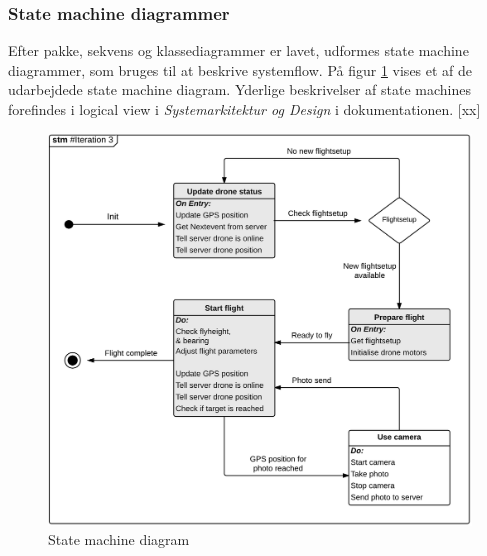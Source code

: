 \newpage

\subsubsection*{State machine diagrammer}
\vspace{-0.3cm}	

Efter pakke, sekvens og klassediagrammer er lavet, udformes state machine diagrammer, som bruges til at beskrive systemflow. På figur \ref{fig:stm} vises et af de udarbejdede state machine diagram. Yderlige beskrivelser af state machines forefindes i logical view i \textit{Systemarkitektur og Design} i dokumentationen. [xx]

\begin{figure}[H]
	\centering
	\includegraphics[width=1\textwidth]{Billeder/State_iteration3.png}
	\vspace{-0.6cm}	
	\caption{State machine diagram}
	\label{fig:stm}
\end{figure}